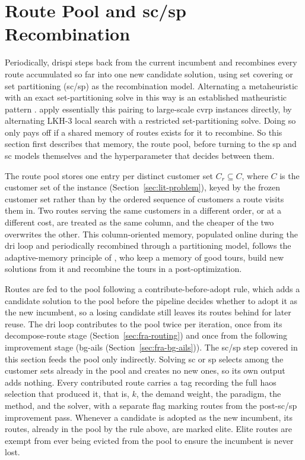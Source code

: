 \section[Route Pool and SC/SP Recombination]{\texorpdfstring{Route Pool and \gls{sc}/\gls{sp} Recombination}{Route Pool and SC/SP Recombination}}\label{sec:fra-sp}
Periodically, \gls{drispi} steps back from the current incumbent and recombines every route accumulated so far into one new candidate solution, using set covering or set partitioning (\gls{sc}/\gls{sp}) as the recombination model. Alternating a metaheuristic with an exact set-partitioning solve in this way is an established matheuristic pattern \citep{hybridizing_jourdan_2009}. \citet{cavaliereIntegratedLocalsearchSetpartitioning2022} apply essentially this pairing to large-scale \gls{cvrp} instances directly, by alternating LKH-3 local search with a restricted set-partitioning solve. Doing so only pays off if a shared memory of routes exists for it to recombine. So this section first describes that memory, the route pool, before turning to the \gls{sp} and \gls{sc} models themselves and the hyperparameter that decides between them.

The route pool stores one entry per distinct customer set $C_r \subseteq C$, where $C$ is the customer set of the instance (Section~\ref{sec:lit-problem}), keyed by the frozen customer set rather than by the ordered sequence of customers a route visits them in. Two routes serving the same customers in a different order, or at a different cost, are treated as the same column, and the cheaper of the two overwrites the other. This column-oriented memory, populated online during the \gls{dri} loop and periodically recombined through a partitioning model, follows the adaptive-memory principle of \citet{rochatProbabilisticDiversificationIntensification1995}, who keep a memory of good tours, build new solutions from it and recombine the tours in a post-optimization.

Routes are fed to the pool following a contribute-before-adopt rule, which adds a candidate solution to the pool before the pipeline decides whether to adopt it as the new incumbent, so a losing candidate still leaves its routes behind for later reuse. The \gls{dri} loop contributes to the pool twice per iteration, once from its decompose-route stage (Section~\ref{sec:fra-routing}) and once from the following improvement stage (\gls{bg-ails} (Section~\ref{sec:fra-bg-ails})). The \gls{sc}/\gls{sp} step covered in this section feeds the pool only indirectly. Solving \gls{sc} or \gls{sp} selects among the customer sets already in the pool and creates no new ones, so its own output adds nothing. Every contributed route carries a tag recording the full \gls{haos} selection that produced it, that is, $k$, the demand weight, the paradigm, the method, and the solver, with a separate flag marking routes from the post-\gls{sc}/\gls{sp} improvement pass. Whenever a candidate is adopted as the new incumbent, its routes, already in the pool by the rule above, are marked elite. Elite routes are exempt from ever being evicted from the pool to ensure the incumbent is never lost.

